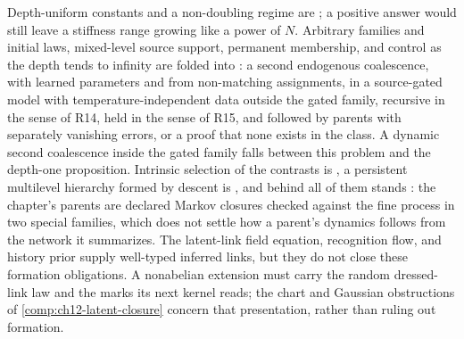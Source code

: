 Depth-uniform constants and a non-doubling regime are ; a positive
answer would still leave a stiffness range growing like a power of \(N\). Arbitrary families and initial laws,
mixed-level source support, permanent membership, and control as the depth tends to infinity are folded into
: a second endogenous coalescence, with learned parameters and from
non-matching assignments, in a source-gated model with temperature-independent data outside the gated
family, recursive in the sense of R14, held in the sense of R15, and followed by parents with separately
vanishing errors, or a proof that none exists in the class. A dynamic second coalescence inside the gated
family falls between this problem and the depth-one proposition. Intrinsic selection of the contrasts is
, a persistent multilevel hierarchy formed by descent is
, and behind all of them stands : the
chapter's parents are declared Markov closures checked against the fine process in two special families,
which does not settle how a parent's dynamics follows from the network it summarizes.
The latent-link field equation, recognition flow, and history prior supply well-typed inferred
links, but they do not close these formation obligations. A nonabelian extension must carry the
random dressed-link law and the marks its next kernel reads; the chart and Gaussian obstructions
of \cref{comp:ch12-latent-closure} concern that presentation, rather than ruling out formation.

